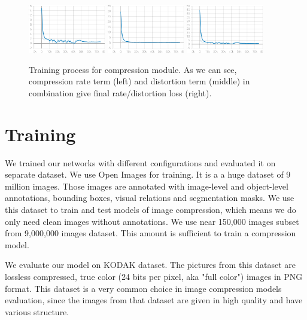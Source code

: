 \begin{figure}[!ht]
    \centering
    \includegraphics[width=0.3\textwidth]{figure/weighted_compression_weighted_rate.png}
    \includegraphics[width=0.3\textwidth]{figure/weighted_compression_weighted_distortion.png}
    \includegraphics[width=0.3\textwidth]{figure/weighted_compression_weighted_R_D.png}
    \caption{Training process for compression module. As we can see, compression rate term (left) and distortion term (middle) in combination give final rate/distortion loss (right).}
    \label{compession-losses}
\end{figure}

\section{Training}

We trained our networks with different configurations and evaluated it on separate dataset. We use Open Images \cite{OpenImages2} for training. It is a a huge dataset of 9 million images. Those images are annotated with image-level and object-level annotations, bounding boxes, visual relations and segmentation masks. We use this dataset to train and test models of image compression, which means we do only need clean images without annotations. We use near 150,000 images subset from 9,000,000 images dataset. This amount is sufficient to train a compression model.

We evaluate our model on KODAK \cite{kodak} dataset. The pictures from this dataset are lossless compressed, true color (24 bits per pixel, aka "full color") images in PNG format. This dataset is a very common choice in image compression models evaluation, since the images from that dataset are given in high quality and have various structure.

